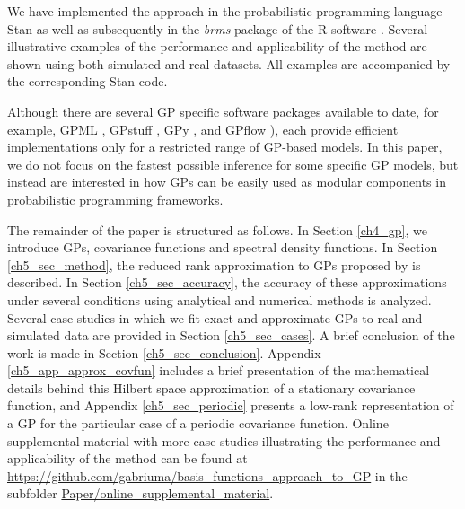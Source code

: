 \documentclass[onecolumn,a4paper,11pt]{article}
\begin{document}

We have implemented the approach in the probabilistic programming language Stan \citep{carpenter2017stan} as well as subsequently in the \textit{brms} package \citep{burkner2017brms} of the R software \citep{R2019R}. Several illustrative examples of the performance and applicability of the method are shown using both simulated and real datasets. All examples are accompanied by the corresponding Stan %
code.

Although there are several GP specific software packages available to date, for example, GPML \citep{rasmussen2010gpml},  GPstuff \citep{vanhatalo2013gpstuff}, GPy \citep{gpy2014}, and GPflow \citep{GPflow2017}), each provide efficient implementations only for a restricted range of GP-based models. In this paper, we do not focus on the fastest possible inference for some specific GP models, but instead are interested in how GPs can be easily used as modular components in probabilistic programming frameworks. 

The remainder of the paper is structured as follows. In Section \ref{ch4_gp}, we introduce GPs, covariance functions and spectral density functions. In Section \ref{ch5_sec_method}, the reduced rank approximation to GPs proposed by \cite{solin2018hilbert} is described. In Section \ref{ch5_sec_accuracy}, the accuracy of these approximations under several conditions using analytical and numerical methods is analyzed. Several case studies in which we fit
exact and approximate GPs to real and simulated data are provided in Section \ref{ch5_sec_cases}. A brief conclusion of the work is made in Section \ref{ch5_sec_conclusion}. Appendix \ref{ch5_app_approx_covfun} includes a brief presentation of the mathematical details behind this Hilbert space approximation of a stationary covariance function, and Appendix \ref{ch5_sec_periodic} presents a low-rank representation of a GP for the particular case of a periodic covariance function. 
Online supplemental material with more case studies illustrating the performance and applicability of the method can be found at \url{https://github.com/gabriuma/basis_functions_approach_to_GP} in the subfolder \url{Paper/online_supplemental_material}.
\end{document}
